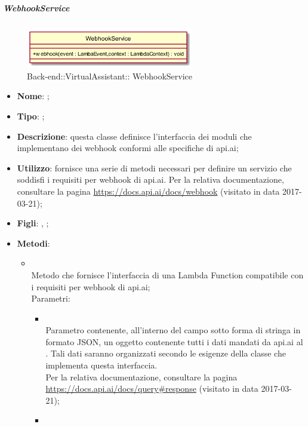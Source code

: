 \hypertarget{WebhookService_label}{\subparagraph{ WebhookService}}
\begin{figure}[h]
	\centering
	\includegraphics[width=0.65\textwidth,height=\textheight,keepaspectratio]{images/ClassWebhookService.png}
	\caption{Back-end::VirtualAssistant:: WebhookService}
\end{figure}
\begin{itemize}
	\item \textbf{Nome}: ;
	\item \textbf{Tipo}: ;
	\item \textbf{Descrizione}: questa classe definisce l'interfaccia dei moduli che implementano dei webhook conformi alle specifiche di api.ai;
	\item \textbf{Utilizzo}: fornisce una serie di metodi necessari per definire un servizio che soddisfi i requisiti per webhook di api.ai.
	Per la relativa documentazione, consultare la pagina \url{https://docs.api.ai/docs/webhook} (visitato in data 2017-03-21);
	\item \textbf{Figli}: , ;
	\item \textbf{Metodi}:
	\begin{itemize}
		\item[]  \\		Metodo che fornisce l'interfaccia di una Lambda Function compatibile con i requisiti per webhook di api.ai;\\
		Parametri:
		\begin{itemize}
			\item {} \\
			Parametro contenente, all'interno del campo  sotto forma di stringa in formato JSON, un oggetto contenente tutti i dati mandati da api.ai al . Tali dati saranno organizzati secondo le esigenze della classe che implementa questa interfaccia.\\
			Per la relativa documentazione, consultare la pagina \url{https://docs.api.ai/docs/query#response}  (visitato in data 2017-03-21);
			\item {} \\

\end{itemize}
\end{itemize}
\end{itemize}
